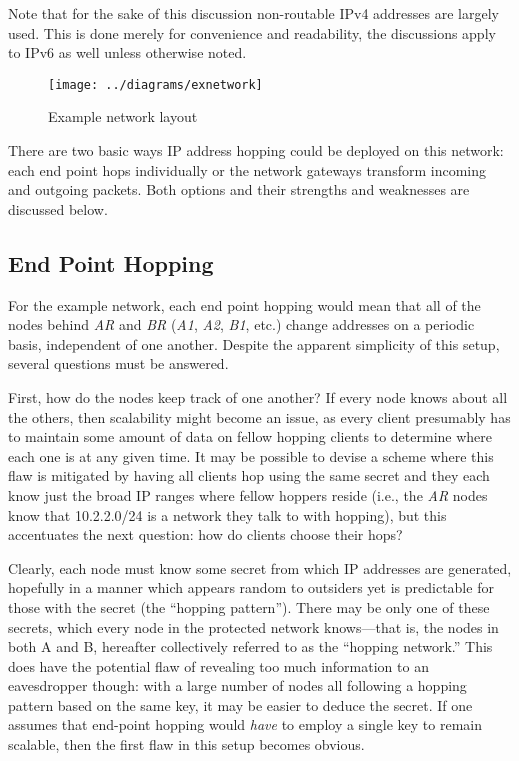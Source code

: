 \par Note that for the sake of this discussion non-routable IPv4 addresses are largely used. This is done merely for convenience and readability, the discussions apply to IPv6 as well unless otherwise noted.

\begin{figure}
	\centering
	\texttt{[image: ../diagrams/exnetwork]}
	\caption{Example network layout }
	\label{fig:exnetwork}
\end{figure}

\par There are two basic ways IP address hopping could be deployed on this network: each end point hops individually or the network gateways transform incoming and outgoing packets. Both options and their strengths and weaknesses are discussed below.

\subsection{End Point Hopping}
\par For the example network, each end point hopping would mean that all of the nodes behind \textit{AR} and \textit{BR} (\textit{A1}, \textit{A2}, \textit{B1}, etc.) change addresses on a periodic basis, independent of one another. Despite the apparent simplicity of this setup, several questions must be answered.

\par First, how do the nodes keep track of one another? If every node knows about all the others, then scalability might become an issue, as every client presumably has to maintain some amount of data on fellow hopping clients to determine where each one is at any given time. It may be possible to devise a scheme where this flaw is mitigated by having all clients hop using the same secret and they each know just the broad IP ranges where fellow hoppers reside (i.e., the \textit{AR} nodes know that 10.2.2.0/24 is a network they talk to with hopping), but this accentuates the next question: how do clients choose their hops?

\par Clearly, each node must know some secret from which IP addresses are generated, hopefully in a manner which appears random to outsiders yet is predictable for those with the secret (the ``hopping pattern''). There may be only one of these secrets, which every node in the protected network knows---that is, the nodes in both A and B, hereafter collectively referred to as the ``hopping network.'' This does have the potential flaw of revealing too much information to an eavesdropper though: with a large number of nodes all following a hopping pattern based on the same key, it may be easier to deduce the secret. If one assumes that end-point hopping would \textit{have} to employ a single key to remain scalable, then the first flaw in this setup becomes obvious.

